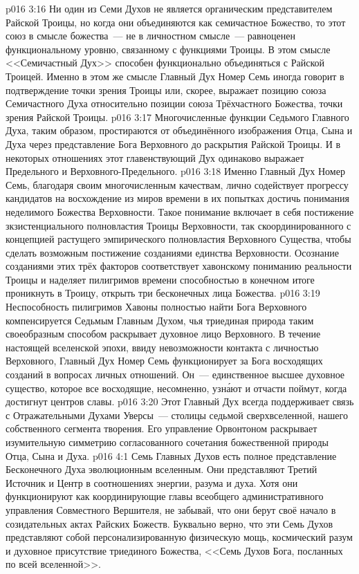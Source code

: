 \vs p016 3:16 Ни один из Семи Духов не является органическим представителем Райской Троицы, но когда они объединяются как семичастное Божество, то этот союз в смысле божества~--- не в личностном смысле~--- равноценен функциональному уровню, связанному с функциями Троицы. В этом смысле <<Семичастный Дух>> способен функционально объединяться с Райской Троицей. Именно в этом же смысле Главный Дух Номер Семь иногда говорит в подтверждение точки зрения Троицы или, скорее, выражает позицию союза Семичастного Духа относительно позиции союза Трёхчастного Божества, точки зрения Райской Троицы.
\vs p016 3:17 Многочисленные функции Седьмого Главного Духа, таким образом, простираются от объединённого изображения  Отца, Сына и Духа через представление  Бога Верховного до раскрытия  Райской Троицы. И в некоторых отношениях этот главенствующий Дух одинаково выражает  Предельного и Верховного\hyp{}Предельного.
\vs p016 3:18 Именно Главный Дух Номер Семь, благодаря своим многочисленным качествам, лично содействует прогрессу кандидатов на восхождение из миров времени в их попытках достичь понимания неделимого Божества Верховности. Такое понимание включает в себя постижение зкзистенциального полновластия Троицы Верховности, так скоординированного с концепцией растущего эмпирического полновластия Верховного Существа, чтобы сделать возможным постижение созданиями единства Верховности. Осознание созданиями этих трёх факторов соответствует хавонскому пониманию реальности Троицы и наделяет пилигримов времени способностью в конечном итоге проникнуть в Троицу, открыть три бесконечных лица Божества.
\vs p016 3:19 Неспособность пилигримов Хавоны полностью найти Бога Верховного компенсируется Седьмым Главным Духом, чья триединая природа таким своеобразным способом раскрывает духовное лицо Верховного. В течение настоящей вселенской эпохи, ввиду невозможности контакта с личностью Верховного, Главный Дух Номер Семь функционирует за Бога восходящих созданий в вопросах личных отношений. Он~--- единственное высшее духовное существо, которое все восходящие, несомненно, узн\'ают и отчасти поймут, когда достигнут центров славы.
\vs p016 3:20 Этот Главный Дух всегда поддерживает связь с Отражательными Духами Уверсы~--- столицы седьмой сверхвселенной, нашего собственного сегмента творения. Его управление Орвонтоном раскрывает изумительную симметрию согласованного сочетания божественной природы Отца, Сына и Духа.
\vs p016 4:1 Семь Главных Духов есть полное представление Бесконечного Духа эволюционным вселенным. Они представляют Третий Источник и Центр в соотношениях энергии, разума и духа. Хотя они функционируют как координирующие главы всеобщего административного управления Совместного Вершителя, не забывай, что они берут своё начало в созидательных актах Райских Божеств. Буквально верно, что эти Семь Духов представляют собой персонализированную физическую мощь, космический разум и духовное присутствие триединого Божества, <<Семь Духов Бога, посланных по всей вселенной>>.
